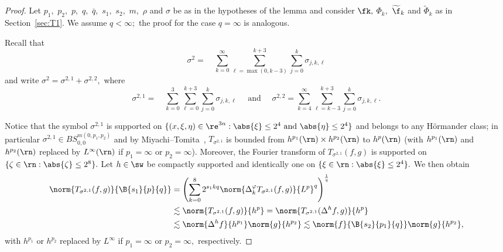 \begin{proof}   Let $p_1,$ $p_2,$ $p,$ $q,$ $\bar{q},$ $s_1,$ $s_2,$ $m,$ $\rho$ and $\sigma$ be as in the hypotheses of the lemma and consider $\fk,$ $\Phi_k,$ $\widetilde{\f}_k$ and $\widetilde{\Phi}_k$ as in Section~\ref{sec:T1}. We assume $q<\infty;$ the proof for the case $q=\infty$ is analogous.

Recall that
\[
\sigma^2= \quad \sum\limits_{k=0}^\infty  \sum\limits_{\ell =\max(0,k-3)}^{k+3} \sum\limits_{j=0}^k \sigma_{j,k,\ell}
\]
and write $\sigma^2=\sigma^{2,1}+\sigma^{2,2},$ where 
\[
\sigma^{2,1}= \quad \sum\limits_{k=0}^{3}  \sum\limits_{\ell =0}^{k+3} \sum\limits_{j=0}^k \sigma_{j,k,\ell}  
\quad \text{ and }\quad  \sigma^{2,2}= \sum\limits_{k=4}^\infty  \sum\limits_{\ell =k-3}^{k+3} \sum\limits_{j=0}^k \sigma_{j,k,\ell}.
\]

Notice that the symbol $\sigma^{2,1}$ is supported on $\{(x,\xi,\eta)\in\re^{3n}: \abs{\xi}\le 2^{4} \text{ and } \abs{\eta}\le2^{4}\}$ and belongs to any H\"ormander class; in particular $\sigma^{2,1}\in BS^{m(0,p_1,p_2)}_{0,0}$ and by Miyachi--Tomita~\cite[Theorem 1.1]{MR3179688}, $T_{\sigma^{2,1}}$ is bounded from $h^{p_1}(\rn)\times h^{p_2}(\rn)$ to $h^{p}(\rn)$ (with $h^{p_1}(\rn)$ and $h^{p_2}(\rn)$ replaced by $L^\infty(\rn)$ if $p_1=\infty$ or $p_2=\infty$). Moreover, the Fourier transform of $T_{\sigma^{2,1}}(f,g)$ is supported on $\{\zeta\in\rn: \abs{\zeta}\le2^{8}\}.$ Let $h\in\sw$  be compactly supported and  identically one on $\{\xi\in\rn:\abs{\xi}\le 2^{4}\}.$ We then obtain
\begin{align*}
\norm{T_{\sigma^{2,1}}(f,g)}{\B{s_1}{p}{q}}&=\left(\sum_{k=0}^{8}2^{s_1kq}\norm{\Delta^{\varphi}_k T_{\sigma^{2,1}}(f,g)}{L^p}^q\right)^{\frac{1}{q}}\\&\lesssim \norm{T_{\sigma^{2,1}}(f,g)}{h^p}=\norm{T_{\sigma^{2,1}}(\Delta^h f,g)}{h^p}\\
&\lesssim \norm{\Delta^h f}{h^{p_1}}\norm{g}{h^{p_2}}\lesssim \norm{f}{\B{s_2}{p_1}{q}}\norm{g}{h^{p_2}},
\end{align*}
with $h^{p_1}$ or $h^{p_2}$ replaced by $L^\infty$ if $p_1=\infty$ or $p_2=\infty,$ respectively.



\end{proof}
